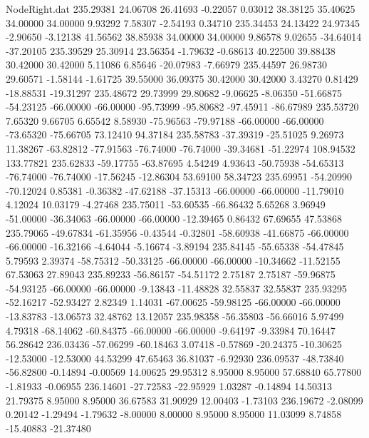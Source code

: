 \begin{filecontents}{NodeRight.dat}
 235.29381   24.06708   26.41693    -0.22057    0.03012   38.38125   35.40625   34.00000   34.00000    9.93292    7.58307   -2.54193    0.34710
 235.34453   24.13422   24.97345    -2.90650   -3.12138   41.56562   38.85938   34.00000   34.00000    9.86578    9.02655  -34.64014  -37.20105
 235.39529   25.30914   23.56354    -1.79632   -0.68613   40.22500   39.88438   30.42000   30.42000    5.11086    6.85646  -20.07983   -7.66979
 235.44597   26.98730   29.60571    -1.58144   -1.61725   39.55000   36.09375   30.42000   30.42000    3.43270    0.81429  -18.88531  -19.31297
 235.48672   29.73999   29.80682    -9.06625   -8.06350  -51.66875  -54.23125  -66.00000  -66.00000  -95.73999  -95.80682  -97.45911  -86.67989
 235.53720    7.65320    9.66705     6.65542    8.58930  -75.96563  -79.97188  -66.00000  -66.00000  -73.65320  -75.66705   73.12410   94.37184
 235.58783  -37.39319  -25.51025     9.26973   11.38267  -63.82812  -77.91563  -76.74000  -76.74000  -39.34681  -51.22974  108.94532  133.77821
 235.62833  -59.17755  -63.87695     4.54249    4.93643  -50.75938  -54.65313  -76.74000  -76.74000  -17.56245  -12.86304   53.69100   58.34723
 235.69951  -54.20990  -70.12024     0.85381   -0.36382  -47.62188  -37.15313  -66.00000  -66.00000  -11.79010    4.12024   10.03179   -4.27468
 235.75011  -53.60535  -66.86432     5.65268    3.96949  -51.00000  -36.34063  -66.00000  -66.00000  -12.39465    0.86432   67.69655   47.53868
 235.79065  -49.67834  -61.35956    -0.43544   -0.32801  -58.60938  -41.66875  -66.00000  -66.00000  -16.32166   -4.64044   -5.16674   -3.89194
 235.84145  -55.65338  -54.47845     5.79593    2.39374  -58.75312  -50.33125  -66.00000  -66.00000  -10.34662  -11.52155   67.53063   27.89043
 235.89233  -56.86157  -54.51172     2.75187    2.75187  -59.96875  -54.93125  -66.00000  -66.00000   -9.13843  -11.48828   32.55837   32.55837
 235.93295  -52.16217  -52.93427     2.82349    1.14031  -67.00625  -59.98125  -66.00000  -66.00000  -13.83783  -13.06573   32.48762   13.12057
 235.98358  -56.35803  -56.66016     5.97499    4.79318  -68.14062  -60.84375  -66.00000  -66.00000   -9.64197   -9.33984   70.16447   56.28642
 236.03436  -57.06299  -60.18463     3.07418   -0.57869  -20.24375  -10.30625  -12.53000  -12.53000   44.53299   47.65463   36.81037   -6.92930
 236.09537  -48.73840  -56.82800    -0.14894   -0.00569   14.00625   29.95312    8.95000    8.95000   57.68840   65.77800   -1.81933   -0.06955
 236.14601  -27.72583  -22.95929     1.03287   -0.14894   14.50313   21.79375    8.95000    8.95000   36.67583   31.90929   12.00403   -1.73103
 236.19672   -2.08099    0.20142    -1.29494   -1.79632   -8.00000    8.00000    8.95000    8.95000   11.03099    8.74858  -15.40883  -21.37480

\end{filecontents}
